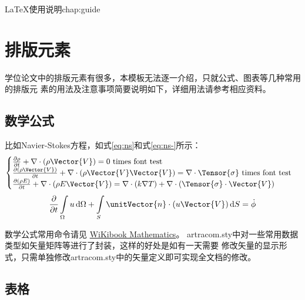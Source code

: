 \begin{cuzchapter}{\LaTeX{}使用说明}{chap:guide}
\section{排版元素}\label{sec:elements}

学位论文中的排版元素有很多，本模板无法逐一介绍，只就公式、图表等几种常用的排版元
素的用法及注意事项简要说明如下，详细用法请参考相应资料。

\subsection{数学公式}\label{sub:equations}

比如Navier-Stokes方程，如式\eqref{eq:ns}和式\eqref{eq:ns-}所示：
\begin{equation}
    \label{eq:ns}
    \begin{cases}
        \frac{\partial \rho}{\partial t} + \nabla\cdot(\rho\Vector{V}) = 0 \ \mathrm{times\ font\ test}\\
        \frac{\partial (\rho\Vector{V})}{\partial t} + \nabla\cdot(\rho\Vector{V}\Vector{V}) = \nabla\cdot\Tensor{\sigma} \ \text{times font test}\\
        \frac{\partial (\rho E)}{\partial t} + \nabla\cdot(\rho E\Vector{V}) = \nabla\cdot(k\nabla T) + \nabla\cdot(\Tensor{\sigma}\cdot\Vector{V})
    \end{cases}
\end{equation}
\begin{equation}
    \label{eq:ns-}
    \frac{\partial }{\partial t}\int\limits_{\Omega} u \, \mathrm{d}\Omega + \int\limits_{S} \unitVector{n}\cdot(u\Vector{V}) \, \mathrm{d}S = \dot{\phi}
\end{equation}

数学公式常用命令请见
\href{https://en.wikibooks.org/wiki/LaTeX/Mathematics}{WiKibook Mathematics}。
artracom.sty中对一些常用数据类型如矢量矩阵等进行了封装，这样的好处是如有一天需要
修改矢量的显示形式，只需单独修改artracom.sty中的矢量定义即可实现全文档的修改。

\subsection{表格}\label{sub:tables}


\end{cuzchapter}
